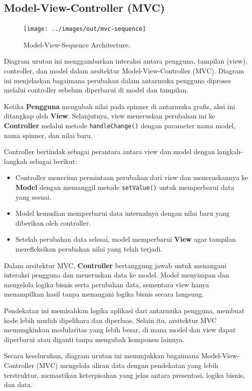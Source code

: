 \subsection{Model-View-Controller (MVC)}
\begin{figure}[h]
	\centering
	\texttt{[image: ../images/out/mvc-sequence]}
	\caption{Model-View-Sequence Architecture.}
	\label{fig:mvc-sequence}
\end{figure}

Diagram urutan ini menggambarkan interaksi antara pengguna, tampilan (view), controller, dan model dalam arsitektur Model-View-Controller (MVC). Diagram ini menjelaskan bagaimana perubahan dalam antarmuka pengguna diproses melalui controller sebelum diperbarui di model dan tampilan.

Ketika \textbf{Pengguna} mengubah nilai pada spinner di antarmuka grafis, aksi ini ditangkap oleh \textbf{View}. Selanjutnya, view meneruskan perubahan ini ke \textbf{Controller} melalui metode \texttt{handleChange()} dengan parameter nama model, nama spinner, dan nilai baru.

Controller bertindak sebagai perantara antara view dan model dengan langkah-langkah sebagai berikut:

\begin{itemize}
	\item Controller menerima permintaan perubahan dari view dan meneruskannya ke \textbf{Model} dengan memanggil metode \texttt{setValue()} untuk memperbarui data yang sesuai.
	\item Model kemudian memperbarui data internalnya dengan nilai baru yang diberikan oleh controller.
	\item Setelah perubahan data selesai, model memperbarui \textbf{View} agar tampilan merefleksikan perubahan nilai yang telah terjadi.
\end{itemize}

Dalam arsitektur MVC, \textbf{Controller} bertanggung jawab untuk menangani interaksi pengguna dan meneruskan data ke model. Model menyimpan dan mengelola logika bisnis serta perubahan data, sementara view hanya menampilkan hasil tanpa menangani logika bisnis secara langsung.

Pendekatan ini memisahkan logika aplikasi dari antarmuka pengguna, membuat kode lebih mudah dipelihara dan diperluas. Selain itu, arsitektur MVC memungkinkan modularitas yang lebih besar, di mana model dan view dapat diperbarui atau diganti tanpa mengubah komponen lainnya.

Secara keseluruhan, diagram urutan ini menunjukkan bagaimana Model-View-Controller (MVC) mengelola aliran data dengan pendekatan yang lebih terstruktur, memastikan keterpisahan yang jelas antara presentasi, logika bisnis, dan data.


